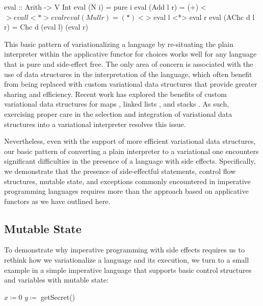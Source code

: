 \documentclass[letterpaper,10pt,onecolumn]{article}
\begin{document}
\begin{program}
eval :: Arith -> V Int
eval (N i) = pure i
eval (Add l r) = (+) <$> eval l <*> eval r
eval (Mul l r) = (*) <$> eval l <*> eval r
eval (AChc d l r) = Chc d (eval l) (eval r)
\end{program}

This basic pattern of variationalizing a language by re-situating the
plain interpreter within the applicative functor for choices works well for any language that is pure
and side-effect free. The only area of concern is associated with the use of data structures in the
interpretation of the language, which often benefit from being replaced with custom variational data structures that
provide greater sharing and efficiency. Recent work has explored the benefits of custom variational
data structures for maps \cite{erictodo}, linked lists \cite{karltodo}, and stacks \cite{mengtodo}.
As such, exercising proper care in the selection and integration of variational data structures
into a variational interpreter resolves this issue.

Nevertheless, even with the support of more efficient
variational data structures, our basic pattern of converting a plain interpreter to a variational one
encounters significant difficulties in the presence of a language with side effects. Specifically, we
demonstrate that the presence of side-effectful statements, control flow structures, mutable state, and exceptions
commonly encountered in imperative programming languages requires more than the approach based
on applicative functors as we have outlined here.

\subsection{Mutable State}

To demonstrate why imperative programming with side effects requires us to rethink how we
variationalize a language and its execution, we turn to a small example in a simple imperative
language that supports basic control structures and variables with mutable state:

\begin{algorithmic}
\STATE $x \coloneqq 0$
\STATE $y \coloneqq$ getSecret()
\ENDIF
\end{algorithmic}
\end{document}

